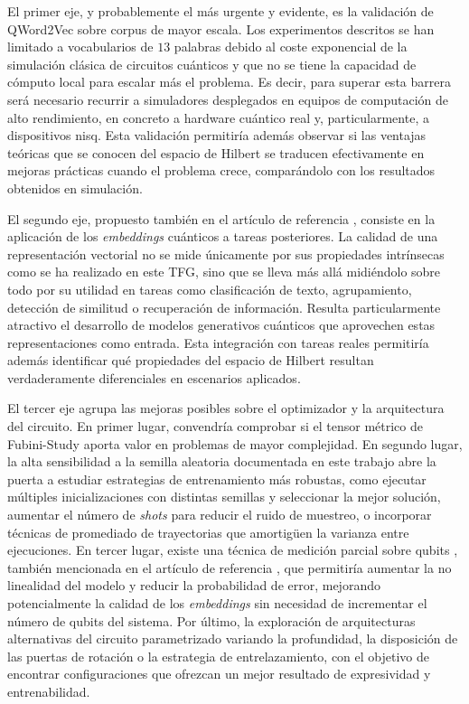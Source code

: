 El primer eje, y probablemente el más urgente y evidente, es la validación de QWord2Vec sobre corpus de mayor escala. Los experimentos descritos se han limitado a vocabularios de $13$ palabras debido al coste exponencial de la simulación clásica de circuitos cuánticos y que no se tiene la capacidad de cómputo local para escalar más el problema. Es decir, para superar esta barrera será necesario recurrir a simuladores desplegados en equipos de computación de alto rendimiento, en concreto a hardware cuántico real y, particularmente, a dispositivos \gls{nisq}. Esta validación permitiría además observar si las ventajas teóricas que se conocen del espacio de Hilbert se traducen efectivamente en mejoras prácticas cuando el problema crece, comparándolo con los resultados obtenidos en simulación.

El segundo eje, propuesto también en el artículo de referencia \cite{ohno_qword2vec_2025}, consiste en la aplicación de los \textit{embeddings} cuánticos a tareas posteriores. La calidad de una representación vectorial no se mide únicamente por sus propiedades intrínsecas como se ha realizado en este TFG, sino que se lleva más allá midiéndolo sobre todo por su utilidad en tareas como clasificación de texto, agrupamiento, detección de similitud o recuperación de información. Resulta particularmente atractivo el desarrollo de modelos generativos cuánticos que aprovechen estas representaciones como entrada. Esta integración con tareas reales permitiría además identificar qué propiedades del espacio de Hilbert resultan verdaderamente diferenciales en escenarios aplicados.

El tercer eje agrupa las mejoras posibles sobre el optimizador y la arquitectura del circuito. En primer lugar, convendría comprobar si el tensor métrico de Fubini-Study aporta valor en problemas de mayor complejidad. En segundo lugar, la alta sensibilidad a la semilla aleatoria documentada en este trabajo abre la puerta a estudiar estrategias de entrenamiento más robustas, como ejecutar múltiples inicializaciones con distintas semillas y seleccionar la mejor solución, aumentar el número de \textit{shots} para reducir el ruido de muestreo, o incorporar técnicas de promediado de trayectorias que amortigüen la varianza entre ejecuciones. En tercer lugar, existe una técnica de medición parcial sobre qubits \cite{huang_power_2021}, también mencionada en el artículo de referencia \cite{ohno_qword2vec_2025}, que permitiría aumentar la no linealidad del modelo y reducir la probabilidad de error, mejorando potencialmente la calidad de los \textit{embeddings} sin necesidad de incrementar el número de qubits del sistema. Por último, la exploración de arquitecturas alternativas del circuito parametrizado variando la profundidad, la disposición de las puertas de rotación o la estrategia de entrelazamiento, con el objetivo de encontrar configuraciones que ofrezcan un mejor resultado de expresividad y entrenabilidad.

